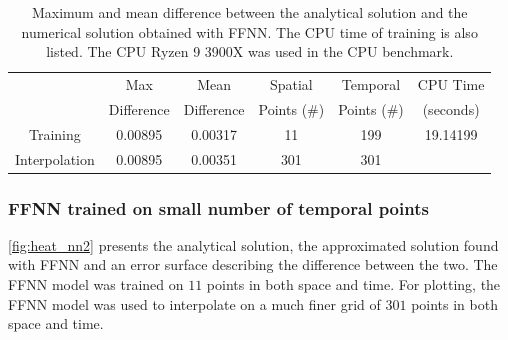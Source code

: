 \begin{table}[H]
\caption{Maximum and mean difference between the analytical solution and the numerical solution obtained with FFNN. The CPU time of training is also listed. The CPU Ryzen 9 3900X was used in the CPU benchmark.}
\centering
{}
\begin{tabular}{cccccc}
\hline
\hline 
& Max & Mean & Spatial & Temporal & CPU Time
\\
& Difference & Difference & Points (\#) & Points (\#) & (seconds)
\\
\hline 
\hline 
Training & 0.00895 & 0.00317 & 11 & 199 & 19.14199
\\
Interpolation & 0.00895 & 0.00351 & 301 & 301 &
\\
\hline
\hline
\end{tabular}
\label{tab:heat_nn1}
\end{table}




\subsubsection{FFNN trained on small number of temporal points}

\autoref{fig:heat_nn2} presents the analytical solution, the approximated solution found with FFNN and an error surface describing the difference between the two. The FFNN model was trained on $11$ points in both space and time. For plotting, the FFNN model was used to interpolate on a much finer grid of $301$ points in both space and time. 

